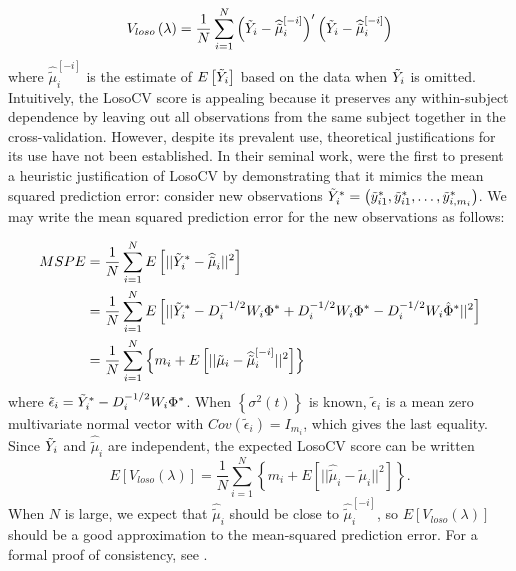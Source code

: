 \begin{equation} \label{eq:LOSOCV}
V_{loso}\left(\lambda\right) = \frac{1}{N}\sum_{i=1}^N \left( \tilde{Y}_i - \widehat{\tilde{\mu}}^{\left[-i\right]}_{i}\right)'\left( \tilde{Y}_i -  \widehat{\tilde{\mu}}^{\left[-i\right]}_{i}\right)
\end{equation}
\noindent
where $\widehat{\tilde{\mu}}^{\left[-i\right]}_{i}$ is the estimate of $E\left[ \tilde{Y}_i \right]$ based on the data when $\tilde{Y}_i$ is omitted. Intuitively, the LosoCV score is appealing because it preserves any within-subject dependence by leaving out all observations from the same subject together in the cross-validation.  However, despite its prevalent use, theoretical justifications for its use have not been established. In their seminal work, \cite{rice1991estimating} were the first to present a heuristic justification of LosoCV by demonstrating that it mimics the mean squared prediction error: consider new observations $\tilde{Y}^*_i = \left(\tilde{y}_{i1}^*, \tilde{y}_{i1}^*, \dots, \tilde{y}_{i, m_i}^*\right)$. We may write the mean squared prediction error for the new observations as follows:  
\bigskip 

\begin{align}
\begin{split}\label{eq:MSPE}
MSPE &= \frac{1}{N}\sum_{i=1}^N E\left[ \vert \vert \tilde{Y}^*_i - \widehat{\tilde{\mu}}_{i} \vert \vert^2 \right]\\
&=  \frac{1}{N}\sum_{i=1}^N E\left[ \vert \vert \tilde{Y}^*_i - D_i^{-1/2}W_i \Phi^* + D_i^{-1/2}W_i \Phi^* - D_i^{-1/2}W_i \hat{\Phi}^*\vert \vert^2 \right]\\
&=  \frac{1}{N}\sum_{i=1}^N \left\{m_i + E\left[ \vert \vert \tilde{\mu}_{i} - \widehat{\tilde{\mu}}^{\left[ -i \right]}_{i} \vert \vert^2 \right] \right\}
\end{split}
\end{align}
\noindent
where $\tilde{\epsilon}_i = \tilde{Y}^*_i - D_i^{-1/2}W_i \Phi^*$. When $\left\{ \sigma^2\left(t\right)\right\}$ is known, $\tilde{\epsilon}_i$ is a mean zero multivariate normal vector with $Cov\left(\tilde{\epsilon}_i\right) = I_{m_i}$, which gives the last equality. Since $\tilde{Y}_i$ and $ \widehat{\tilde{\mu}}_{i} $ are independent, the expected LosoCV score can be written
\begin{equation} \label{eq:MSPE_LOSOCV}
E\left[V_{loso}\left(\lambda\right) \right] =  \frac{1}{N}\sum_{i=1}^N\left\{ m_i +  E\left[ \vert \vert \widehat{\tilde{\mu}}_{i} - \tilde{\mu}_{i} \vert \vert^2 \right] \right\}. 
\end{equation}
\noindent
When $N$ is large, we expect that $\widehat{\tilde{\mu}}_{i}$ should be close to $\widehat{\tilde{\mu}}^{\left[ -i \right]}_{i}$, so $E\left[V_{loso}\left(\lambda\right) \right]$ should be a good approximation to the mean-squared prediction error. For a formal proof of consistency, see \cite{xu2012asymptotic}.

